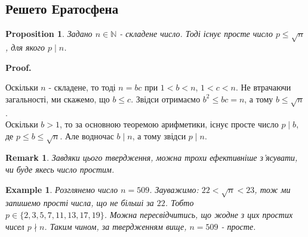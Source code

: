 \documentclass[a4paper, 14pt]{extarticle}
\makeatletter
\theoremstyle{theoremdd}
\theoremstyle{theoremdd}
\theoremstyle{theoremdd}
\theoremstyle{theoremdd}
\newtheorem{example}[theorem]{Example}
\theoremstyle{theoremdd}
\newtheorem{proposition}[theorem]{Proposition}
\theoremstyle{theoremdd}
\newtheorem{remark}[theorem]{Remark}
\theoremstyle{theoremdd}
\theoremstyle{theoremdd}
\def\qed{$\blacksquare$}
\renewenvironment{proof}[1][Proof.\\]{\par
\pushQED{\hfill \qed}%
\normalfont \topsep6\p@\@plus6\p@\relax
\trivlist
\item\relax
{\bfseries
#1\@addpunct{.}}\hspace\labelsep\ignorespaces
}{%
\popQED\endtrivlist\@endpefalse
}
\makeatother
\begin{document}
\subsection{Решето Ератосфена}
\begin{proposition}
Задано $n \in \mathbb{N}$ - складене число. Тоді існує просте число $p \leq \sqrt{n}$, для якого $p \mid n$.
\end{proposition}

\begin{proof}
Оскільки $n$ - складене, то тоді $n = bc$ при $1 < b < n$, $1 < c < n$. Не втрачаючи загальності, ми скажемо, що $b \leq c$. Звідси отримаємо $b^2 \leq bc = n$, а тому $b \leq \sqrt{n}$.\\
Оскільки $b > 1$, то за основною теоремою арифметики, існує просте число $p \mid b$, де $p \leq b \leq \sqrt{n}$. Але водночас $b \mid n$, а тому звідси $p \mid n$.
\end{proof}

\begin{remark}
Завдяки цього твердження, можна трохи ефективніше з'ясувати, чи буде якесь число простим.
\end{remark}

\begin{example}
Розглянемо число $n = 509$. Зауважимо: $22 < \sqrt{n} < 23$, тож ми запишемо прості числа, що не більші за $22$. Тобто \\ $p \in \{2,3,5,7,11,13,17,19\}$. Можна пересвідчитись, що жодне з цих простих чисел $p \nmid n$. Таким чином, за твердженням вище, $n = 509$ - просте.
\end{example}
\end{document}
